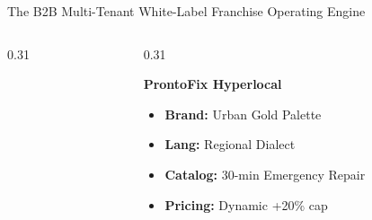 \documentclass[aspectratio=169,11pt]{beamer}
\begin{document}
\begin{frame}{The B2B Multi-Tenant White-Label Franchise Operating Engine}
\begin{columns}[T]
\begin{column}{0.31\textwidth}
  \end{column}
  \begin{column}{0.31\textwidth}
    \begin{tcolorbox}[colback=white,colframe=SmartGold,arc=3mm,title=\textbf{\tiny FRANCHISE C: QUICK-CHORE HUB}]
      {\tiny \textbf{ProntoFix Hyperlocal}}
      \begin{itemize}\setlength\itemsep{0.15em}
        \item \textbf{\tiny Brand:} Urban Gold Palette
        \item \textbf{\tiny Lang:} Regional Dialect
        \item \textbf{\tiny Catalog:} 30-min Emergency Repair
        \item \textbf{\tiny Pricing:} Dynamic +20\% cap
      \end{itemize}
    \end{tcolorbox}
  \end{column}
\end{columns}
\end{frame}
\end{document}
